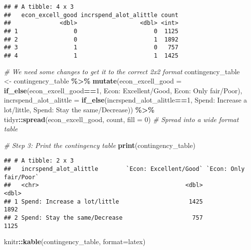 \documentclass[
  11pt,
]{article}
\newenvironment{Shaded}{\begin{snugshade}}{\end{snugshade}}
\newcommand{\AttributeTok}[1]{\textcolor[rgb]{0.13,0.29,0.53}{#1}}
\newcommand{\CommentTok}[1]{\textcolor[rgb]{0.56,0.35,0.01}{\textit{#1}}}
\newcommand{\DecValTok}[1]{\textcolor[rgb]{0.00,0.00,0.81}{#1}}
\newcommand{\FunctionTok}[1]{\textcolor[rgb]{0.13,0.29,0.53}{\textbf{#1}}}
\newcommand{\NormalTok}[1]{#1}
\newcommand{\OtherTok}[1]{\textcolor[rgb]{0.56,0.35,0.01}{#1}}
\newcommand{\SpecialCharTok}[1]{\textcolor[rgb]{0.81,0.36,0.00}{\textbf{#1}}}
\newcommand{\StringTok}[1]{\textcolor[rgb]{0.31,0.60,0.02}{#1}}
\begin{document}
\begin{verbatim}
## # A tibble: 4 x 3
##   econ_excell_good incrspend_alot_alittle count
##              <dbl>                  <dbl> <int>
## 1                0                      0  1125
## 2                0                      1  1892
## 3                1                      0   757
## 4                1                      1  1425
\end{verbatim}

\begin{Shaded}
\begin{Highlighting}[]
\CommentTok{\# We need some changes to get it to the correct 2x2 format}
\NormalTok{contingency\_table }\OtherTok{\textless{}{-}}\NormalTok{ contingency\_table }\SpecialCharTok{\%\textgreater{}\%}
  \FunctionTok{mutate}\NormalTok{(}\AttributeTok{econ\_excell\_good =} \FunctionTok{if\_else}\NormalTok{(econ\_excell\_good}\SpecialCharTok{==}\DecValTok{1}\NormalTok{, }
                                    \StringTok{\textquotesingle{}Econ: Excellent/Good\textquotesingle{}}\NormalTok{, }\StringTok{\textquotesingle{}Econ: Only fair/Poor\textquotesingle{}}\NormalTok{),}
         \AttributeTok{incrspend\_alot\_alittle =} \FunctionTok{if\_else}\NormalTok{(incrspend\_alot\_alittle}\SpecialCharTok{==}\DecValTok{1}\NormalTok{, }
                                          \StringTok{\textquotesingle{}Spend: Increase a lot/little\textquotesingle{}}\NormalTok{, }\StringTok{\textquotesingle{}Spend: Stay the same/Decrease\textquotesingle{}}\NormalTok{)) }\SpecialCharTok{\%\textgreater{}\%}
\NormalTok{  tidyr}\SpecialCharTok{::}\FunctionTok{spread}\NormalTok{(econ\_excell\_good, count, }\AttributeTok{fill =} \DecValTok{0}\NormalTok{)  }\CommentTok{\# Spread into a wide format table}

\CommentTok{\# Step 3: Print the contingency table}
\FunctionTok{print}\NormalTok{(contingency\_table)}
\end{Highlighting}
\end{Shaded}

\begin{verbatim}
## # A tibble: 2 x 3
##   incrspend_alot_alittle        `Econ: Excellent/Good` `Econ: Only fair/Poor`
##   <chr>                                          <dbl>                  <dbl>
## 1 Spend: Increase a lot/little                    1425                   1892
## 2 Spend: Stay the same/Decrease                    757                   1125
\end{verbatim}

\begin{Shaded}
\begin{Highlighting}[]
\NormalTok{knitr}\SpecialCharTok{::}\FunctionTok{kable}\NormalTok{(contingency\_table, }\AttributeTok{format=}\StringTok{\textquotesingle{}latex\textquotesingle{}}\NormalTok{)}
\end{Highlighting}
\end{Shaded}
\end{document}
